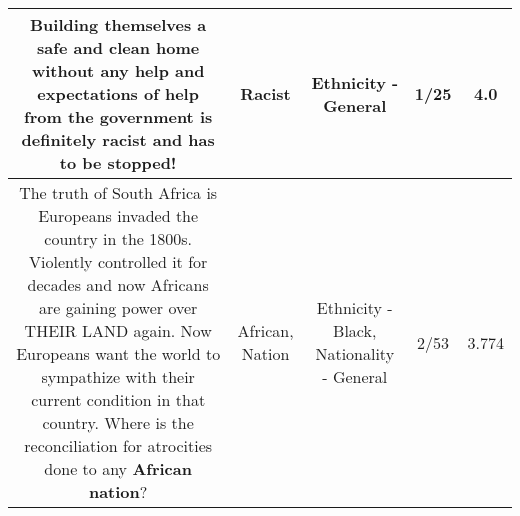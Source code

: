 \documentclass[11pt]{article}
\newlength\mylength
\begin{document}
\begin{center}
\begin{longtable}{|C{.65\mylength}|C{.30\mylength}|C{.12\mylength}|C{.12\mylength}|C{.12\mylength}|}
  \small Building themselves a safe and clean home without any help and expectations of help from the government is definitely \textbf{racist} and has to be stopped!\normalsize   & Racist & Ethnicity - General & 1/25 & 4.0 \\  \hline
  \small The truth of South Africa is Europeans invaded the country in the 1800s. Violently controlled it for decades and now Africans are gaining power over THEIR LAND again. Now Europeans want the world to sympathize with their current condition in that country. Where is the reconciliation for atrocities done to any \textbf{African} \textbf{nation}?\normalsize   & African, Nation & Ethnicity - Black, Nationality - General & 2/53 & 3.774 \\  \hline

\end{longtable}
\end{center}
\end{document}
